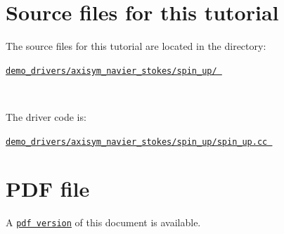 

\hypertarget{index_sources}{}\section{Source files for this tutorial}\label{index_sources}

\begin{DoxyItemize}
\item The source files for this tutorial are located in the directory\+:~\newline
~\newline
\begin{center} \href{../../../../demo_drivers/axisym_navier_stokes/spin_up/}{\tt demo\+\_\+drivers/axisym\+\_\+navier\+\_\+stokes/spin\+\_\+up/ } \end{center} ~\newline

\item The driver code is\+: ~\newline
~\newline
\begin{center} \href{../../../../demo_drivers/axisym_navier_stokes/spin_up/spin_up.cc}{\tt demo\+\_\+drivers/axisym\+\_\+navier\+\_\+stokes/spin\+\_\+up/spin\+\_\+up.\+cc } \end{center} 
\end{DoxyItemize}

 

 \hypertarget{index_pdf}{}\section{P\+D\+F file}\label{index_pdf}
A \href{../latex/refman.pdf}{\tt pdf version} of this document is available. 
